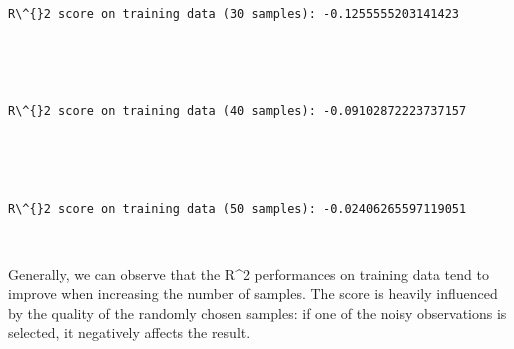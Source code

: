 \documentclass[11pt]{article}
\begin{document}
    \begin{center}
    \end{center}
    { \hspace*{\fill} \\}
    
    \begin{Verbatim}[commandchars=\\\{\}]
R\^{}2 score on training data (30 samples): -0.1255555203141423



    \end{Verbatim}

    \begin{center}
    \end{center}
    { \hspace*{\fill} \\}
    
    \begin{Verbatim}[commandchars=\\\{\}]
R\^{}2 score on training data (40 samples): -0.09102872223737157



    \end{Verbatim}

    \begin{center}
    \end{center}
    { \hspace*{\fill} \\}
    
    \begin{Verbatim}[commandchars=\\\{\}]
R\^{}2 score on training data (50 samples): -0.02406265597119051



    \end{Verbatim}

    Generally, we can observe that the R\^{}2 performances on training data
tend to improve when increasing the number of samples. The score is
heavily influenced by the quality of the randomly chosen samples: if one
of the noisy observations is selected, it negatively affects the result.
\end{document}
